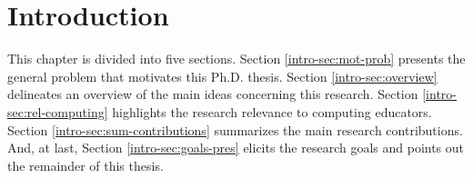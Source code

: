 \chapter{Introduction}
\label{chap:intro}

This chapter is divided into five sections. Section \ref{intro-sec:mot-prob} presents the general problem that motivates this \acrshort{Ph.D.} thesis. Section \ref{intro-sec:overview} delineates an overview of the main ideas concerning this research. Section \ref{intro-sec:rel-computing} highlights the research relevance to computing educators. Section \ref{intro-sec:sum-contributions} summarizes the main research contributions. And, at last, Section \ref{intro-sec:goals-pres} elicits the research goals and points out the remainder of this thesis.